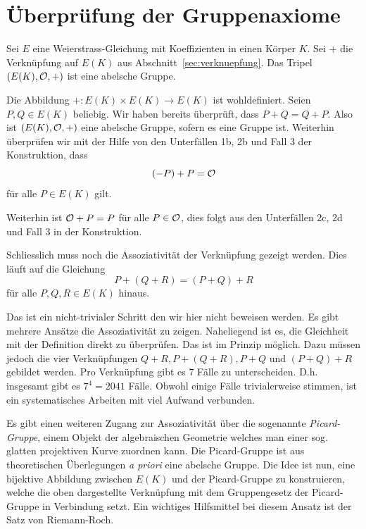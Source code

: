 \section{Überprüfung der Gruppenaxiome}

\begin{satz}
  Sei $E$ eine Weierstrass-Gleichung mit Koeffizienten in einen Körper
  $K$. Sei $+$ die Verknüpfung auf $E(K)$ aus
  Abschnitt~\ref{sec:verknuepfung}.
  Das Tripel $(E(K),{\mathcal O},+)$ ist eine abelsche Gruppe. 
\end{satz}

Die Abbildung $+\colon E(K)\times E(K) \rightarrow E(K)$ ist
wohldefiniert. Seien $P,Q\in E(K)$ beliebig.
Wir haben bereits überprüft, dass $P+Q=Q+P$. Also ist
$(E(K),{\mathcal O},+)$  eine abelsche Gruppe, sofern es eine Gruppe ist. 
Weiterhin überprüfen wir mit der Hilfe von den  Unterfällen
1b, 2b und Fall 3 der Konstruktion, dass
$$  (-P)+P = {\mathcal O}$$
für alle $P\in E(K)$ gilt.

Weiterhin ist ${\mathcal O} + P = P $ für alle $P\in {\mathcal O}$, dies folgt aus den
Unterfällen 2c, 2d und Fall 3 in der Konstruktion. 

Schliesslich muss noch die Assoziativität der Verknüpfung gezeigt
werden. Dies läuft auf die Gleichung
$$
P + (Q + R) = (P+Q)+R$$
für alle $P,Q,R\in E(K)$ hinaus.

Das ist ein nicht-trivialer Schritt den wir hier nicht beweisen
werden. Es gibt mehrere Ansätze die Assoziativität zu zeigen.
Naheliegend ist es, die Gleichheit mit der Definition direkt zu
überprüfen. Das ist im Prinzip möglich. Dazu müssen jedoch die vier
Verknüpfungen $Q+R, P+(Q+R), P+Q$ und $(P+Q)+R$ gebildet werden.
Pro Verknüpfung gibt es $7$ Fälle zu unterscheiden. D.h. insgesamt gibt
es $7^4= 2041$ Fälle. Obwohl einige Fälle trivialerweise stimmen, ist
ein systematisches Arbeiten mit viel Aufwand verbunden.


Es gibt einen weiteren Zugang zur Assoziativität über die sogenannte
 \emph{Picard-Gruppe}, einem  Objekt der algebraischen Geometrie
 welches man einer sog. glatten projektiven Kurve
 zuordnen kann. Die Picard-Gruppe ist aus theoretischen
Überlegungen \textit{a priori} eine abelsche Gruppe. Die Idee ist nun, eine
bijektive Abbildung zwischen $E(K)$ und der Picard-Gruppe zu
konstruieren, welche die oben dargestellte Verknüpfung mit dem
Gruppengesetz der Picard-Gruppe in Verbindung setzt.
Ein wichtiges Hilfsmittel bei diesem Ansatz ist der Satz von
Riemann-Roch. 

